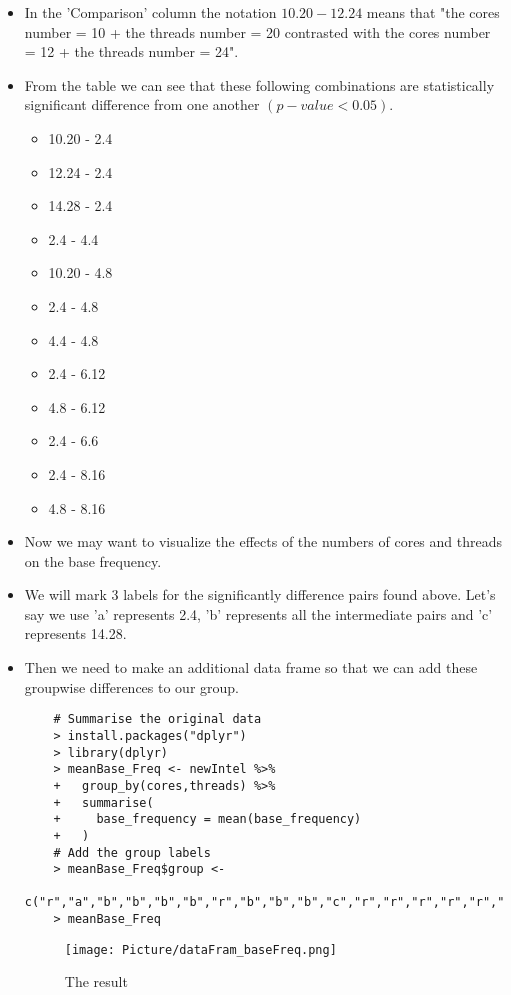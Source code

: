 \documentclass[a4paper]{article}
\begin{document}
\begin{itemize}
    \item[] In the 'Comparison' column the notation $10.20-12.24$ means that "the cores number = 10 + the threads number = 20 contrasted with the cores number = 12 + the threads number = 24".
    
    \item[] From the table we can see that these following combinations are statistically significant difference from one another $(p-value < 0.05)$.
    \begin{itemize}
        \item[] 10.20 - 2.4
        \item[] 12.24 - 2.4
        \item[] 14.28 - 2.4
        \item[] 2.4 - 4.4
        \item[] 10.20 - 4.8
        \item[] 2.4 - 4.8
        \item[] 4.4 - 4.8
        \item[] 2.4 - 6.12
        \item[] 4.8 - 6.12
        \item[] 2.4 - 6.6
        \item[] 2.4 - 8.16
        \item[] 4.8 - 8.16
    \end{itemize}
    
    \item[] Now we may want to visualize the effects of the numbers of cores and threads on the base frequency.
    
    \item[] We will mark 3 labels for the significantly difference pairs found above. Let's say we use 'a' represents 2.4, 'b' represents all the intermediate pairs and 'c' represents 14.28.
    \item[] Then we need to make an additional data frame so that we can add these groupwise differences to our group.
    \begin{lstlisting}
    # Summarise the original data
    > install.packages("dplyr")
    > library(dplyr)
    > meanBase_Freq <- newIntel %>%
    +   group_by(cores,threads) %>%
    +   summarise(
    +     base_frequency = mean(base_frequency)
    +   )
    # Add the group labels
    > meanBase_Freq$group <- 
        c("r","a","b","b","b","b","r","b","b","b","c","r","r","r","r","r","r")
    > meanBase_Freq 
    \end{lstlisting}
    
    \begin{figure}[H]
        \centering
        \texttt{[image: Picture/dataFram\_baseFreq.png]}
        \caption{The result}
        \label{7.1.10}
    \end{figure}
    

\end{itemize}
\end{document}
